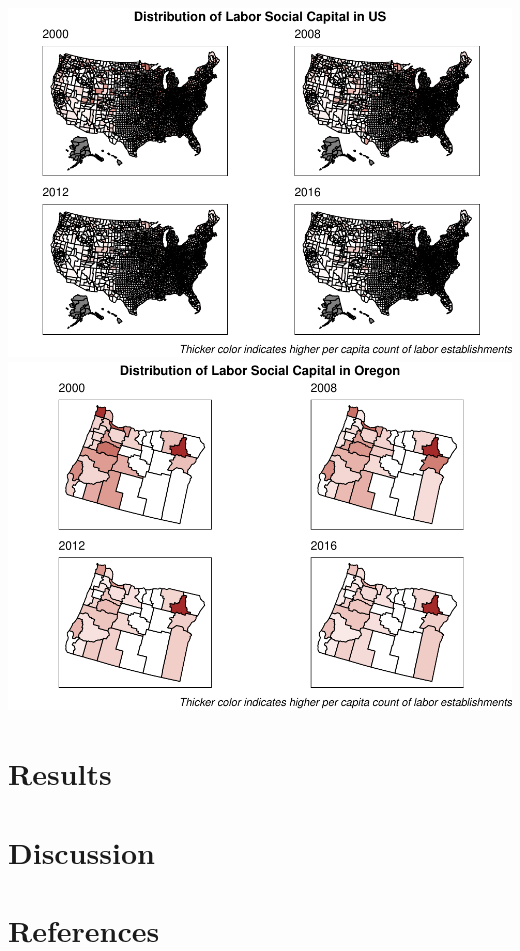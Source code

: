 \documentclass[
  english,
  man]{apa6}
\begin{document}
\includegraphics{Script_files/figure-latex/visualization labor social capital maps-1.pdf} \includegraphics{Script_files/figure-latex/visualization labor social capital maps-2.pdf}

\hypertarget{results}{%
\section{Results}\label{results}}

\hypertarget{discussion}{%
\section{Discussion}\label{discussion}}

\newpage

\hypertarget{references}{%
\section{References}\label{references}}

\begingroup
\setlength{\parindent}{-0.5in}
\setlength{\leftskip}{0.5in}

\hypertarget{refs}{}

\endgroup


\printbibliography
\end{document}
